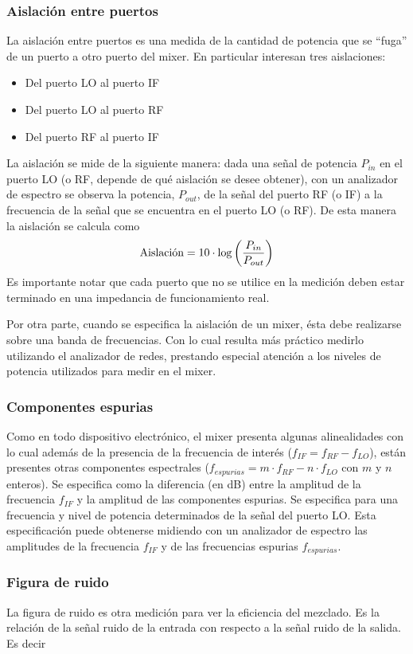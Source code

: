 \documentclass[a4paper,10pt]{article}
\begin{document}
		\subsubsection{Aislación entre puertos}
		La aislación entre puertos es una medida de la cantidad de potencia que se ``fuga'' de un puerto a otro puerto del mixer.
		En particular interesan tres aislaciones:
		\begin{itemize}
		\item Del puerto LO al puerto IF
		\item Del puerto LO al puerto RF
		\item Del puerto RF al puerto IF
		\end{itemize}
		La aislaci\'on se mide de la siguiente manera: dada una se\~nal de potencia $P_{in}$ en el puerto LO (o RF, depende de qu\'e aislaci\'on se desee obtener), con un analizador de espectro se observa la potencia, $P_{out}$, de la señal del puerto RF (o IF) a la frecuencia de la señal que se encuentra en el puerto LO (o RF). De esta manera la aislaci\'on se calcula como		$$\textmd{Aislaci\'on}=10\cdot\log\left(\frac{P_{in}}{P_{out}}\right)$$
		Es importante notar que cada puerto que no se utilice en la medici\'on deben estar terminado en una impedancia de funcionamiento real.
		
		Por otra parte, cuando se especifica la aislaci\'on de un mixer, \'esta debe realizarse sobre una banda de frecuencias. Con lo cual resulta m\'as pr\'actico medirlo utilizando el analizador de redes, prestando especial atenci\'on a los niveles de potencia utilizados para medir en el mixer.
		\subsubsection{Componentes espurias}
		Como en todo dispositivo electr\'onico, el mixer presenta algunas alinealidades con lo cual adem\'as de la presencia de la frecuencia de inter\'es ($f_{IF}=f_{RF}-f_{LO}$), est\'an presentes otras componentes espectrales ($f_{espurias}=m\cdot f_{RF}-n\cdot f_{LO}$ con $m$ y $n$ enteros). Se especifica como la diferencia (en dB) entre la amplitud de la frecuencia $f_{IF}$ y la amplitud de las componentes espurias. Se especifica para una frecuencia y nivel de potencia determinados de la señal del puerto LO.
		Esta especificaci\'on puede obtenerse midiendo con un analizador de espectro las amplitudes de la frecuencia $f_{IF}$ y de las frecuencias espurias $f_{espurias}$.

		\subsubsection{Figura de ruido}
		\indent La figura de ruido es otra medición para ver la eficiencia del 
		mezclado. Es la relación de la señal ruido de la entrada con respecto a
		la señal ruido de la salida. Es decir
		
\end{document}
